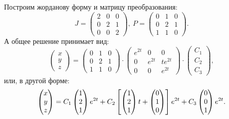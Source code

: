 		Построим жорданову форму и матрицу преобразования:
		\[ J = \begin{pmatrix} 2 & 0 & 0 \\ 0 & 2 & 1 \\ 0 & 0 & 2 \end{pmatrix}, ~ P = \begin{pmatrix} 0 & 1 & 0 \\ 0 & 2 & 1 \\ 1 & 1 & 0 \end{pmatrix}. \]
		А общее решение принимает вид:
		\[ \begin{pmatrix} x \\ y \\ z \end{pmatrix} = \begin{pmatrix} 0 & 1 & 0 \\ 0 & 2 & 1 \\ 1 & 1 & 0 \end{pmatrix} \cdot \begin{pmatrix} e^{2t} & 0 & 0 \\ 0 & e^{2t} & te^{2t} \\ 0 & 0 & e^{2t} \end{pmatrix} \cdot \begin{pmatrix} C_1 \\ C_2 \\ C_3 \end{pmatrix}, \]
		или, в другой форме:
		\[ \begin{pmatrix} x \\ y \\ z \end{pmatrix} = C_1 \begin{pmatrix} 1 \\ 2 \\ 1 \end{pmatrix} e^{2t} + C_2 \left[ \begin{pmatrix} 1 \\ 2 \\ 1 \end{pmatrix} t + \begin{pmatrix} 0 \\ 1 \\ 0 \end{pmatrix} \right] e^{2t} + C_3 \begin{pmatrix} 0 \\ 0 \\ 1 \end{pmatrix} e^{2t}. \]
